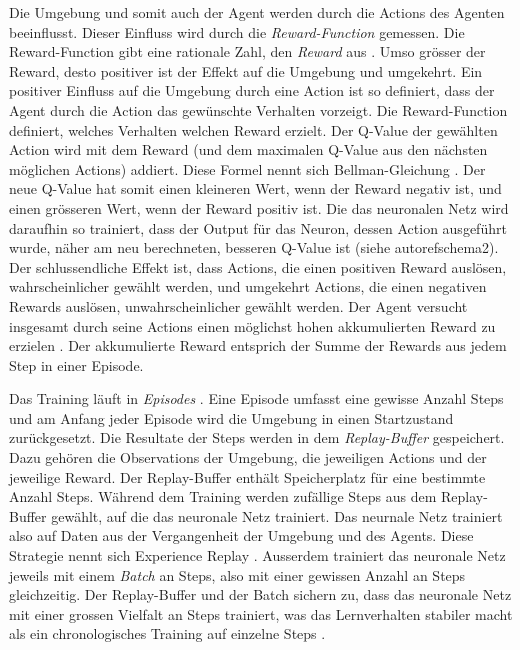 Die Umgebung und somit auch der Agent werden durch die Actions des Agenten
beeinflusst. Dieser Einfluss wird durch die \emph{Reward-Function} gemessen. Die
Reward-Function gibt eine rationale Zahl, den \emph{Reward} aus \cite[S.
75]{sutton_reinforcement_2014}. Umso grösser der Reward, desto positiver ist der
Effekt auf die Umgebung und umgekehrt. Ein positiver Einfluss auf die Umgebung
durch eine Action ist so definiert, dass der Agent durch die Action das
gewünschte Verhalten vorzeigt. Die Reward-Function definiert, welches Verhalten
welchen Reward erzielt. Der Q-Value der gewählten Action wird mit dem Reward
(und dem maximalen Q-Value aus den nächsten möglichen Actions) addiert. Diese
Formel nennt sich Bellman-Gleichung \cite[S. 3]{mnih_playing_nodate}. Der neue
Q-Value hat somit einen kleineren Wert, wenn der Reward negativ ist, und einen
grösseren Wert, wenn der Reward positiv ist. Die das neuronalen Netz wird
daraufhin so trainiert, dass der Output für das Neuron, dessen Action ausgeführt
wurde, näher am neu berechneten, besseren Q-Value ist (siehe autoref{schema2}).
Der schlussendliche Effekt ist, dass Actions, die einen positiven Reward
auslösen, wahrscheinlicher gewählt werden, und umgekehrt Actions, die einen
negativen Rewards auslösen, unwahrscheinlicher gewählt werden. Der Agent
versucht insgesamt durch seine Actions einen möglichst hohen akkumulierten
Reward zu erzielen \cite[S. 57]{sutton_reinforcement_2014}. Der akkumulierte
Reward entsprich der Summe der Rewards aus jedem Step in einer Episode.


Das Training läuft in \emph{Episodes} \cite[S. 14]{sutton_reinforcement_2014}.
Eine Episode umfasst eine gewisse Anzahl Steps und am Anfang jeder Episode wird
die Umgebung in einen Startzustand zurückgesetzt. Die Resultate der Steps werden
in dem \emph{Replay-Buffer} gespeichert. Dazu gehören die Observations der
Umgebung, die jeweiligen Actions und der jeweilige Reward. Der Replay-Buffer
enthält Speicherplatz für eine bestimmte Anzahl Steps. Während dem Training
werden zufällige Steps aus dem Replay-Buffer gewählt, auf die das neuronale Netz
trainiert. Das neurnale Netz trainiert also auf Daten aus der Vergangenheit der
Umgebung und des Agents. Diese Strategie nennt sich Experience Replay \cite[S.
5]{mnih_playing_nodate}. Ausserdem trainiert das neuronale Netz jeweils mit
einem \emph{Batch} an Steps, also mit einer gewissen Anzahl an Steps
gleichzeitig. Der Replay-Buffer und der Batch sichern zu, dass das neuronale
Netz mit einer grossen Vielfalt an Steps trainiert, was das Lernverhalten
stabiler macht als ein chronologisches Training auf einzelne Steps
\cite{phd_how_2021}.


